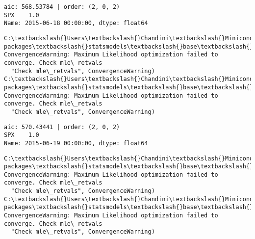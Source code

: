 \documentclass[11pt]{article}
\begin{document}
    \begin{Verbatim}[commandchars=\\\{\}]
aic: 568.53784 | order: (2, 0, 2)
SPX    1.0
Name: 2015-06-18 00:00:00, dtype: float64

    \end{Verbatim}

    \begin{Verbatim}[commandchars=\\\{\}]
C:\textbackslash{}Users\textbackslash{}Chandini\textbackslash{}Miniconda3\textbackslash{}envs\textbackslash{}auquan\textbackslash{}lib\textbackslash{}site-packages\textbackslash{}statsmodels\textbackslash{}base\textbackslash{}model.py:496: ConvergenceWarning: Maximum Likelihood optimization failed to converge. Check mle\_retvals
  "Check mle\_retvals", ConvergenceWarning)
C:\textbackslash{}Users\textbackslash{}Chandini\textbackslash{}Miniconda3\textbackslash{}envs\textbackslash{}auquan\textbackslash{}lib\textbackslash{}site-packages\textbackslash{}statsmodels\textbackslash{}base\textbackslash{}model.py:496: ConvergenceWarning: Maximum Likelihood optimization failed to converge. Check mle\_retvals
  "Check mle\_retvals", ConvergenceWarning)

    \end{Verbatim}

    \begin{Verbatim}[commandchars=\\\{\}]
aic: 570.43441 | order: (2, 0, 2)
SPX    1.0
Name: 2015-06-19 00:00:00, dtype: float64

    \end{Verbatim}

    \begin{Verbatim}[commandchars=\\\{\}]
C:\textbackslash{}Users\textbackslash{}Chandini\textbackslash{}Miniconda3\textbackslash{}envs\textbackslash{}auquan\textbackslash{}lib\textbackslash{}site-packages\textbackslash{}statsmodels\textbackslash{}base\textbackslash{}model.py:496: ConvergenceWarning: Maximum Likelihood optimization failed to converge. Check mle\_retvals
  "Check mle\_retvals", ConvergenceWarning)
C:\textbackslash{}Users\textbackslash{}Chandini\textbackslash{}Miniconda3\textbackslash{}envs\textbackslash{}auquan\textbackslash{}lib\textbackslash{}site-packages\textbackslash{}statsmodels\textbackslash{}base\textbackslash{}model.py:496: ConvergenceWarning: Maximum Likelihood optimization failed to converge. Check mle\_retvals
  "Check mle\_retvals", ConvergenceWarning)

    \end{Verbatim}
\end{document}
